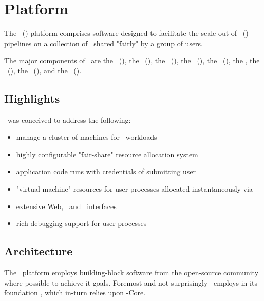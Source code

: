 
\chapter{Platform}

    The \varDistributedUIMAClusterComputing~(\varDUCC) platform comprises software 
    designed to facilitate the scale-out of 
    \varUnstructuredInformationManagementArchitecture~(\varUIMA) pipelines on a 
    collection of \varNodesMachinesComputers~shared "fairly" by a group of users.
    
    The major components of \varDUCC~are the \varOrchestrator~(\varOR), the \varJobDriver~(\varJD), 
    the \varResourceManager~(\varRM), the \varProcessManager~(\varPM), the \varServicesManager~(\varSM), 
    the \varAgents, the \varCommandLineInterface~(\varCLI), the \varApplicationProgramInterface~(\varAPI), 
    and the \varWebServer~(\varWS).
        
    \section{Highlights}
    
    \varDUCC~was conceived to address the following:
    
    \begin{itemize}
      \item manage a cluster of machines for \varUIMA~workloads
      \item highly configurable "fair-share" resource allocation system
      \item application code runs with credentials of submitting user
      \item "virtual machine" resources for user processes allocated instantaneously via \varLinuxControlGroups
      \item extensive Web, \varCLI~and \varAPI~interfaces
      \item rich debugging support for user processes
    \end{itemize} 
    
    \section{Architecture}
    
    The \varDUCC~platform employs building-block software from the open-source community
    where possible to achieve it goals. Foremost and not surprisingly \varDUCC~employs in
    its foundation \varUIMAAS, which in-turn relies upon \varUIMA-Core.
    
